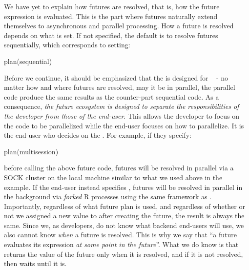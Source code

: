 We have yet to explain how futures are resolved, that is, how the
future expression is evaluated.  This is the part where futures
naturally extend themselves to asynchronous and parallel processing.
How a future is resolved depends on what  is set.
If not specified, the default is to resolve futures sequentially,
which corresponds to setting:
\begin{example}
plan(sequential)
\end{example}
Before we continue, it should be emphasized that the 
is designed for ~\citep{Lamport1979} - no
matter how and where futures are resolved, may it be in parallel, the
parallel code produce the same results as the counter-part sequential
code.  As a consequence, \emph{the future ecosystem is designed to
separate the responsibilities of the developer from those of the
end-user}.  This allows the developer to focus on the code to be
parallelized while the end-user focuses on how to parallelize.  It is
the end-user who decides on the .  For example, if they
specify:
\begin{example}
plan(multisession)
\end{example}
before calling the above future code, futures will be resolved in
parallel via a SOCK cluster on the local machine similar to what we
used above in the  example.  If the end-user instead
specifies , futures will be resolved in parallel
in the background via \emph{forked} R processes using the same
framework as .  Importantly, regardless of what
future plan is used, and regardless of whether or not we assigned a
new value to  after creating the future, the result is always
the same.  Since we, as developers, do not know what backend end-users
will use, we also cannot know \emph{when} a future is resolved.  This
is why we say that ``a future evaluates its expression \emph{at some
point in the future}''.  What we do know is that 
returns the value of the future only when it is resolved, and if it is
not resolved, then  waits until it is.

